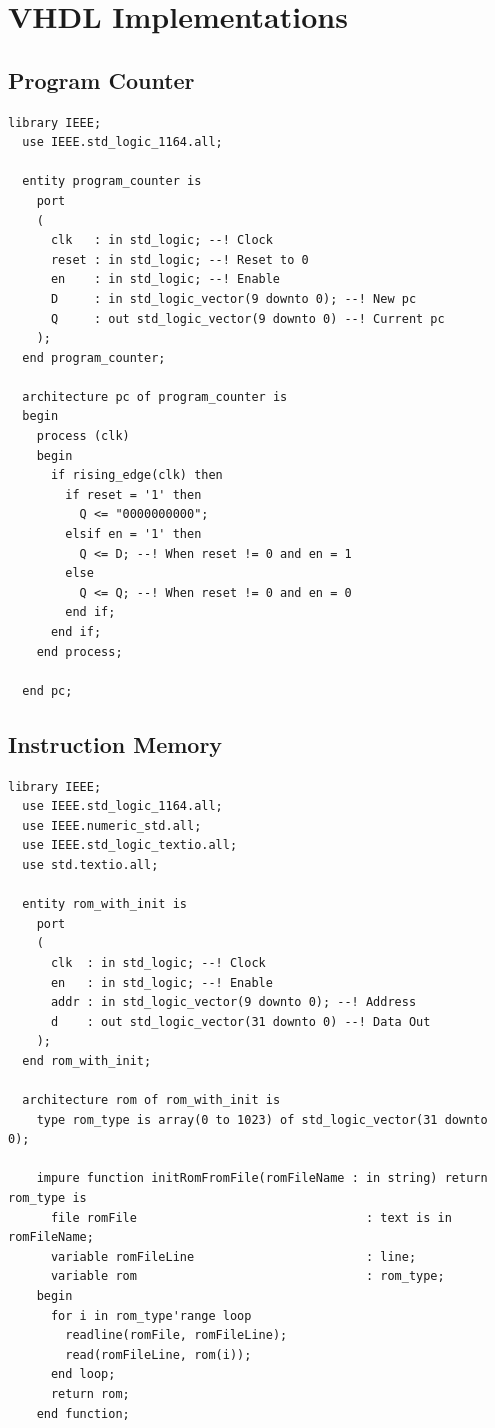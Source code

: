 \documentclass[lettersize,journal]{IEEEtran}
\begin{document}
{\appendices
\section*{VHDL Implementations}
\subsection{Program Counter}
\begin{Verbatim}[breaklines]
  library IEEE;
  use IEEE.std_logic_1164.all;
  
  entity program_counter is
    port
    (
      clk   : in std_logic; --! Clock
      reset : in std_logic; --! Reset to 0
      en    : in std_logic; --! Enable
      D     : in std_logic_vector(9 downto 0); --! New pc
      Q     : out std_logic_vector(9 downto 0) --! Current pc
    );
  end program_counter;
  
  architecture pc of program_counter is
  begin
    process (clk)
    begin
      if rising_edge(clk) then
        if reset = '1' then
          Q <= "0000000000";
        elsif en = '1' then
          Q <= D; --! When reset != 0 and en = 1
        else
          Q <= Q; --! When reset != 0 and en = 0
        end if;
      end if;
    end process;
  
  end pc;
\end{Verbatim}
\subsection{Instruction Memory}
\begin{Verbatim}[breaklines]
  library IEEE;
  use IEEE.std_logic_1164.all;
  use IEEE.numeric_std.all;
  use IEEE.std_logic_textio.all;
  use std.textio.all;
  
  entity rom_with_init is
    port
    (
      clk  : in std_logic; --! Clock
      en   : in std_logic; --! Enable
      addr : in std_logic_vector(9 downto 0); --! Address
      d    : out std_logic_vector(31 downto 0) --! Data Out
    );
  end rom_with_init;
  
  architecture rom of rom_with_init is
    type rom_type is array(0 to 1023) of std_logic_vector(31 downto 0);
  
    impure function initRomFromFile(romFileName : in string) return rom_type is
      file romFile                                : text is in romFileName;
      variable romFileLine                        : line;
      variable rom                                : rom_type;
    begin
      for i in rom_type'range loop
        readline(romFile, romFileLine);
        read(romFileLine, rom(i));
      end loop;
      return rom;
    end function;
  

\end{Verbatim}}
\end{document}
